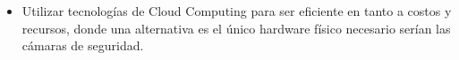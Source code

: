 \begin{itemize}
    \item Utilizar tecnologías de Cloud Computing para ser eficiente en tanto a costos y recursos, donde una alternativa es el único hardware físico necesario serían las cámaras de seguridad. 
\end{itemize}